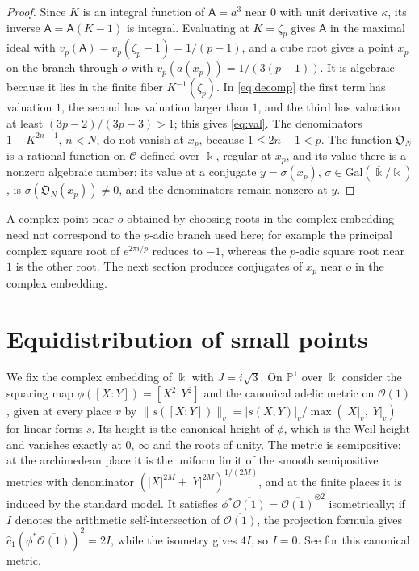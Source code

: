 \documentclass[11pt]{amsart}
\numberwithin{equation}{section}
\theoremstyle{definition}
\theoremstyle{remark}
\newcommand{\abs}[1]{\lvert #1\rvert}
\newcommand{\norm}[1]{\lVert #1\rVert}
\newcommand{\Obs}{\mathfrak{O}}
\newcommand{\kk}{\Bbbk}
\newcommand{\sA}{\mathsf A}
\begin{document}
\begin{proof}
Since $K$ is an integral function of $\sA=a^3$ near $0$ with unit derivative $\kappa$, its inverse $\sA=\sA(K-1)$ is integral. Evaluating at $K=\zeta_p$ gives $\sA$ in the maximal ideal with $v_p(\sA)=v_p(\zeta_p-1)=1/(p-1)$, and a cube root gives a point $x_p$ on the branch through $o$ with $v_p(a(x_p))=1/(3(p-1))$. It is algebraic because it lies in the finite fiber $K^{-1}(\zeta_p)$. In \eqref{eq:decomp} the first term has valuation $1$, the second has valuation larger than $1$, and the third has valuation at least $(3p-2)/(3p-3)>1$; this gives \eqref{eq:val}. The denominators $1-K^{2n-1}$, $n<N$, do not vanish at $x_p$, because $1\le2n-1<p$. The function $\Obs_N$ is a rational function on $\mathcal C$ defined over $\kk$, regular at $x_p$, and its value there is a nonzero algebraic number; its value at a conjugate $y=\sigma(x_p)$, $\sigma\in\mathrm{Gal}(\overline\kk/\kk)$, is $\sigma(\Obs_N(x_p))\ne0$, and the denominators remain nonzero at $y$.
\end{proof}

A complex point near $o$ obtained by choosing roots in the complex embedding need not correspond to the $p$-adic branch used here; for example the principal complex square root of $e^{2\pi i/p}$ reduces to $-1$, whereas the $p$-adic square root near $1$ is the other root. The next section produces conjugates of $x_p$ near $o$ in the complex embedding.

\section{Equidistribution of small points}\label{sec:equid}

We fix the complex embedding of $\kk$ with $J=i\sqrt3$. On $\mathbb P^1$ over $\kk$ consider the squaring map $\phi([X:Y])=[X^2:Y^2]$ and the canonical adelic metric on $\mathcal O(1)$, given at every place $v$ by $\norm{s([X:Y])}_v=\abs{s(X,Y)}_v/\max(\abs X_v,\abs Y_v)$ for linear forms $s$. Its height is the canonical height of $\phi$, which is the Weil height and vanishes exactly at $0$, $\infty$ and the roots of unity. The metric is semipositive: at the archimedean place it is the uniform limit of the smooth semipositive metrics with denominator $(\abs X^{2M}+\abs Y^{2M})^{1/(2M)}$, and at the finite places it is induced by the standard model. It satisfies $\phi^*\overline{\mathcal O(1)}=\overline{\mathcal O(1)}^{\otimes2}$ isometrically; if $I$ denotes the arithmetic self-intersection of $\overline{\mathcal O(1)}$, the projection formula gives $\widehat c_1(\phi^*\overline{\mathcal O(1)})^2=2I$, while the isometry gives $4I$, so $I=0$. See \cite[Sections 1.1 and 3.5]{Yuan} for this canonical metric.
\end{document}
